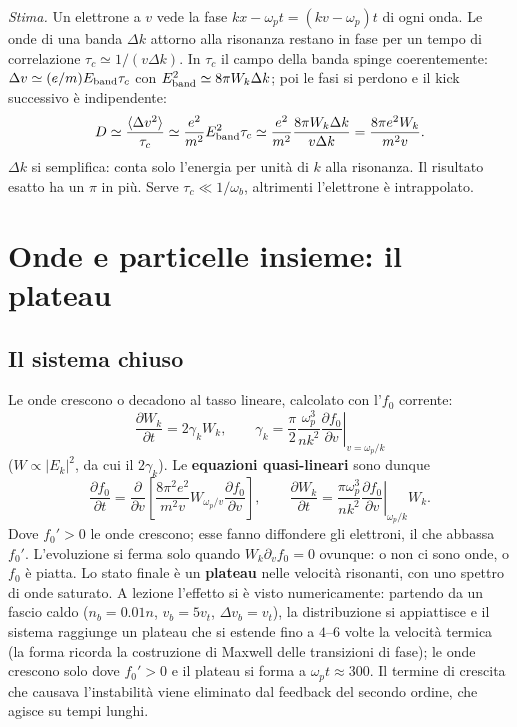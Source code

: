 \emph{Stima.} Un elettrone a $v$ vede la fase $kx-\omega_pt=(kv-\omega_p)t$ di ogni onda. Le onde di una banda $\Delta k$ attorno alla risonanza restano in fase per un tempo di correlazione $\tau_c\simeq1/(v\Delta k)$. In $\tau_c$ il campo della banda spinge coerentemente: $\Delta v\simeq(e/m)E_{\rm band}\tau_c$ con $E_{\rm band}^2\simeq8\pi W_k\Delta k$; poi le fasi si perdono e il kick successivo è indipendente:
\begin{equation}
D\simeq\frac{\langle\Delta v^2\rangle}{\tau_c}\simeq\frac{e^2}{m^2}E_{\rm band}^2\tau_c\simeq\frac{e^2}{m^2}\frac{8\pi W_k\Delta k}{v\Delta k}=\frac{8\pi e^2W_k}{m^2v}.
\end{equation}
$\Delta k$ si semplifica: conta solo l'energia per unità di $k$ alla risonanza. Il risultato esatto ha un $\pi$ in più. Serve $\tau_c\ll1/\omega_b$, altrimenti l'elettrone è intrappolato.

\section{Onde e particelle insieme: il plateau}

\subsection{Il sistema chiuso}
Le onde crescono o decadono al tasso lineare, calcolato con l'$f_0$ corrente:
\begin{equation}
\frac{\partial W_k}{\partial t}=2\gamma_kW_k,\qquad\gamma_k=\frac\pi2\frac{\omega_p^3}{nk^2}\left.\frac{\partial f_0}{\partial v}\right|_{v=\omega_p/k}
\end{equation}
($W\propto|E_k|^2$, da cui il $2\gamma_k$). Le \textbf{equazioni quasi-lineari} sono dunque
\begin{equation}
\frac{\partial f_0}{\partial t}=\frac{\partial}{\partial v}\left[\frac{8\pi^2e^2}{m^2v}W_{\omega_p/v}\frac{\partial f_0}{\partial v}\right],\qquad\frac{\partial W_k}{\partial t}=\frac{\pi\omega_p^3}{nk^2}\left.\frac{\partial f_0}{\partial v}\right|_{\omega_p/k}W_k .
\end{equation}
Dove $f_0'>0$ le onde crescono; esse fanno diffondere gli elettroni, il che abbassa $f_0'$. L'evoluzione si ferma solo quando $W_k\partial_vf_0=0$ ovunque: o non ci sono onde, o $f_0$ è piatta. Lo stato finale è un \textbf{plateau} nelle velocità risonanti, con uno spettro di onde saturato. A lezione l'effetto si è visto numericamente: partendo da un fascio caldo ($n_b=0.01n$, $v_b=5v_t$, $\Delta v_b=v_t$), la distribuzione si appiattisce e il sistema raggiunge un plateau che si estende fino a $4$--$6$ volte la velocità termica (la forma ricorda la costruzione di Maxwell delle transizioni di fase); le onde crescono solo dove $f_0'>0$ e il plateau si forma a $\omega_pt\approx300$. Il termine di crescita che causava l'instabilità viene eliminato dal feedback del secondo ordine, che agisce su tempi lunghi.

